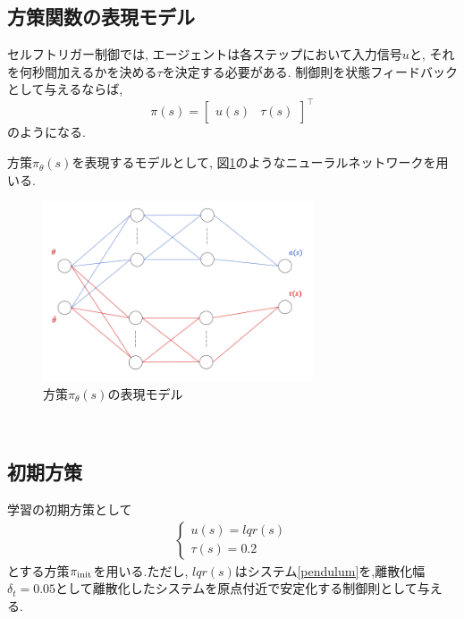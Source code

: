 \documentclass[dvipdfmx]{ampmt}
\begin{document}
\subsection{方策関数の表現モデル}
セルフトリガー制御では, エージェントは各ステップにおいて入力信号$u$と, それを何秒間加えるかを決める$\tau$を決定する必要がある. 制御則を状態フィードバックとして与えるならば, 
\begin{equation}
	\pi(s) = \begin{bmatrix}u(s) & \tau(s)\end{bmatrix}^{\top}
\end{equation}
のようになる.\par
方策$\pi_{\theta}(s)$を表現するモデルとして, 図\ref{split_NN}のようなニューラルネットワークを用いる.
\begin{figure}[h]
	\centering
 	\includegraphics[width=8cm]{split_NN.png}
 	\caption{方策$\pi_{\theta}(s)$の表現モデル} \label{split_NN}
\end{figure}\\


\subsection{初期方策}
学習の初期方策として
\begin{align}
\begin{cases}
	u(s)=lqr(s)\\
	\tau(s)=0.2
\end{cases} \label{pi_init}
\end{align}
とする方策$\pi_{\rm{init}}$を用いる.ただし, $lqr(s)$はシステム\eqref{pendulum}を,離散化幅$\delta_t=0.05$として離散化したシステムを原点付近で安定化する制御則として与える.
\end{document}
